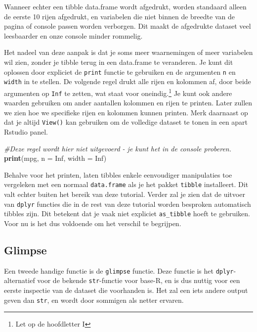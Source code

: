 \documentclass[]{tufte-book}
\newenvironment{Shaded}{}{}
\newcommand{\CommentTok}[1]{\textcolor[rgb]{0.38,0.63,0.69}{\textit{#1}}}
\newcommand{\DataTypeTok}[1]{\textcolor[rgb]{0.56,0.13,0.00}{#1}}
\newcommand{\KeywordTok}[1]{\textcolor[rgb]{0.00,0.44,0.13}{\textbf{#1}}}
\newcommand{\NormalTok}[1]{#1}
\newcommand{\OtherTok}[1]{\textcolor[rgb]{0.00,0.44,0.13}{#1}}
\begin{document}
Wanneer echter een tibble data.frame wordt afgedrukt, worden standaard alleen de eerste 10 rijen afgedrukt, en variabelen die niet binnen de breedte van de pagina of console passen worden verborgen. Dit maakt de afgedrukte dataset veel leesbaarder en onze console minder rommelig.

Het nadeel van deze aanpak is dat je soms meer waarnemingen of meer variabelen wil zien, zonder je tibble terug in een data.frame te veranderen. Je kunt dit oplossen door expliciet de \texttt{print} functie te gebruiken en de argumenten \texttt{n} en \texttt{width} in te stellen. De volgende regel drukt alle rijen en kolommen af, door beide argumenten op \texttt{Inf} te zetten, wat staat voor oneindig.\footnote{Let op de hoofdletter I} Je kunt ook andere waarden gebruiken om ander aantallen kolommen en rijen te printen. Later zullen we zien hoe we specifieke rijen en kolommen kunnen printen. Merk daarnaast op dat je altijd \texttt{View()} kan gebruiken om de volledige dataset te tonen in een apart Rstudio panel.

\begin{Shaded}
\begin{Highlighting}[]
\CommentTok{#Deze regel wordt hier niet uitgevoerd - je kunt het in de console proberen.}
\KeywordTok{print}\NormalTok{(mpg, }\DataTypeTok{n =} \OtherTok{Inf}\NormalTok{, }\DataTypeTok{width =} \OtherTok{Inf}\NormalTok{)}
\end{Highlighting}
\end{Shaded}

Behalve voor het printen, laten tibbles enkele eenvoudiger manipulaties toe vergeleken met een normaal \texttt{data.frame} als je het pakket \texttt{tibble} installeert. Dit valt echter buiten het bereik van deze tutorial. Verder zal je zien dat de uitvoer van \texttt{dplyr} functies die in de rest van deze tutorial worden besproken automatisch tibbles zijn. Dit betekent dat je vaak niet expliciet \texttt{as\_tibble} hoeft te gebruiken. Voor nu is het dus voldoende om het verschil te begrijpen.

\hypertarget{glimpse}{%
\subsection{Glimpse}\label{glimpse}}

Een tweede handige functie is de \texttt{glimpse} functie. Deze functie is het \texttt{dplyr}-alternatief voor de bekende \texttt{str}-functie voor base-R, en is dus nuttig voor een eerste inspectie van de dataset die voorhanden is. Het zal een iets andere output geven dan \texttt{str}, en wordt door sommigen als netter ervaren.
\end{document}
